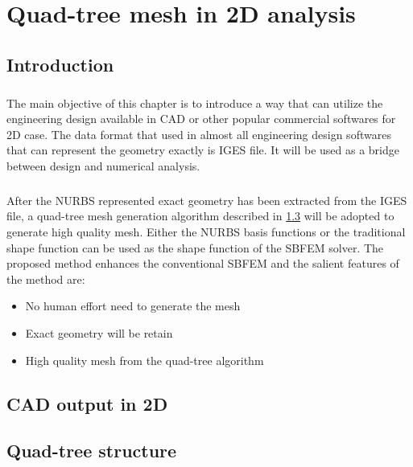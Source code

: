 \chapter{Quad-tree mesh in 2D analysis}

\section{Introduction}
\paragraph{}
The main objective of this chapter is to introduce a way that can utilize the engineering design available in CAD or other popular commercial softwares for 2D case.
The data format that used in almost all engineering design softwares that can represent the geometry exactly is IGES file.
It will be used as a bridge between design and numerical analysis.

\paragraph{}
After the NURBS represented exact geometry has been extracted from the IGES file, a quad-tree mesh generation algorithm described in \ref{qt_sc:quadtree} will be adopted to generate high quality mesh.
Either the NURBS basis functions or the traditional shape function can be used as the shape function of the SBFEM solver.
The proposed method enhances the conventional SBFEM and the salient features of the method are:
    \begin{itemize}
        \item No human effort need to generate the mesh
        \item Exact geometry will be retain
        \item High quality mesh from the quad-tree algorithm
    \end{itemize}
\pagebreak

\section{CAD output in 2D}
\label{qt_sc:iges}


\section{Quad-tree structure}
\label{qt_sc:quadtree}


